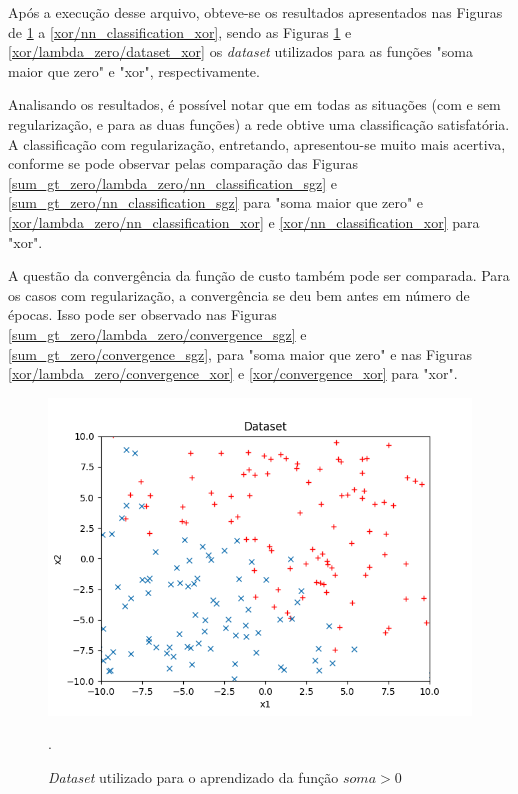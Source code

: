 \documentclass[conference]{IEEEtran}
\begin{document}
Após a execução desse arquivo, obteve-se os resultados apresentados nas Figuras de \ref{sum_gt_zero/lambda_zero/dataset_sgz} a \ref{xor/nn_classification_xor}, sendo as Figuras \ref{sum_gt_zero/lambda_zero/dataset_sgz} e \ref{xor/lambda_zero/dataset_xor} os \textit{dataset} utilizados para as funções "soma maior que zero" e "xor", respectivamente.

Analisando os resultados, é possível notar que em todas as situações (com e sem regularização, e para as duas funções) a rede obtive uma classificação satisfatória. A classificação com regularização, entretando, apresentou-se muito mais acertiva, conforme se pode observar pelas comparação das Figuras \ref{sum_gt_zero/lambda_zero/nn_classification_sgz} e \ref{sum_gt_zero/nn_classification_sgz} para "soma maior que zero" e \ref{xor/lambda_zero/nn_classification_xor} e \ref{xor/nn_classification_xor} para "xor". 

A questão da convergência da função de custo também pode ser comparada. Para os casos com regularização, a convergência se deu bem antes em número de épocas. Isso pode ser observado nas Figuras \ref{sum_gt_zero/lambda_zero/convergence_sgz} e \ref{sum_gt_zero/convergence_sgz}, para "soma maior que zero" e nas Figuras \ref{xor/lambda_zero/convergence_xor} e \ref{xor/convergence_xor} para "xor". 

\begin{figure}[htbp]
\centering
\centerline{\includegraphics[scale=0.5]{imagens/sum_gt_zero/lambda_zero/dataset_sgz.png}}
\caption{\textit{Dataset} utilizado para o aprendizado da função $soma > 0$}.
\label{sum_gt_zero/lambda_zero/dataset_sgz}
\end{figure}
\end{document}
